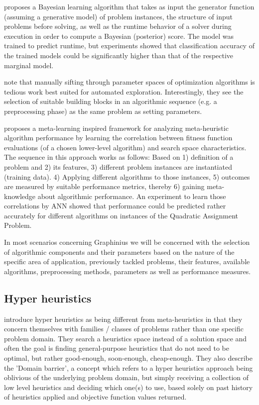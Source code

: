 \cite{Horvitz2001} proposes a Bayesian learning algorithm that takes as input the generator function (assuming a generative model) of problem instances, the structure of input problems before solving, as well as the runtime behavior of a solver during execution in order to compute a Bayesian (posterior) score. The model was trained to predict runtime, but experiments showed that classification accuracy of the trained models could be significantly higher than that of the respective marginal model.

\cite{Hutter2007} note that manually sifting through parameter spaces of optimization algorithms is tedious work best suited for automated exploration. Interestingly, they see the selection of suitable building blocks in an algorithmic sequence (e.g. a preprocessing phase) as the same problem as setting parameters.

\cite{SmithMiles2008} proposes a meta-learning inspired framework for analyzing meta-heuristic algorithm performance by learning the correlation between fitness function evaluations (of a chosen lower-level algorithm) and search space characteristics. The sequence in this approach works as follows: Based on 1) definition of a problem and 2) its features, 3) different problem instances are instantiated (training data). 4) Applying different algorithms to those instances, 5) outcomes are measured by suitable performance metrics, thereby 6) gaining meta-knowledge about algorithmic performance. An experiment to learn those correlations by ANN showed that performance could be predicted rather accurately for different algorithms on instances of the Quadratic Assignment Problem.

In most scenarios concerning Graphinius we will be concerned with the selection of algorithmic components and their parameters based on the nature of the specific area of application, previously tackled problems, their features, available algorithms, preprocessing methods, parameters as well as performance measures.


\subsection{Hyper heuristics}
\label{ssect:hyper_heuristics}

\cite{Burke:2003:Hyperheuristics} introduce hyper heuristics as being different from meta-heuristics in that they concern themselves with families / classes of problems rather than one specific problem domain. They search a heuristics space instead of a solution space and often the goal is finding general-purpose heuristics that do not need to be optimal, but rather good-enough, soon-enough, cheap-enough. They also describe the 'Domain barrier', a concept which refers to a hyper heuristics approach being oblivious of the underlying problem domain, but simply receiving a collection of low level heuristics and deciding which one(s) to use, based solely on past history of heuristics applied and objective function values returned.

